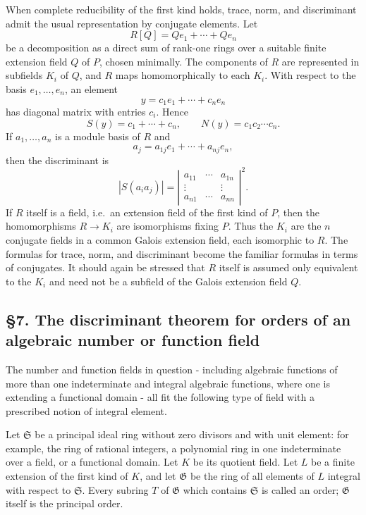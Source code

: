\documentclass[11pt]{article}
\begin{document}
When complete reducibility of the first kind holds, trace, norm, and
discriminant admit the usual representation by conjugate elements. Let
\[
  R[Q]=Qe_1+
\cdots+Qe_n
\] be a decomposition as a direct sum of rank-one rings over a suitable
finite extension field \(Q\) of \(P\), chosen minimally. The components
of \(R\) are represented in subfields \(K_i\) of \(Q\), and \(R\) maps
homomorphically to each \(K_i\). With respect to the basis \(e_1,
\ldots,e_n\), an element \[
  y=c_1e_1+
\cdots+c_ne_n
\] has diagonal matrix with entries \(c_i\). Hence \[
  S(y)=c_1+
\cdots+c_n,
  \qquad
  N(y)=c_1c_2\cdots c_n.
\] If \(a_1,
\ldots,a_n\) is a module basis of \(R\) and \[
  a_j=a_{1j}e_1+
\cdots+a_{nj}e_n,
\] then the discriminant is \[
  |S(a_i a_j)|=
  \left|
  \begin{matrix}
  a_{11}&\cdots&a_{1n}\\
  \vdots& &\vdots\\
  a_{n1}&\cdots&a_{nn}
  \end{matrix}
  \right|^2.
\] If \(R\) itself is a field, i.e.~an extension field of the first kind
of \(P\), then the homomorphisms \(R\to K_i\) are isomorphisms fixing
\(P\). Thus the \(K_i\) are the \(n\) conjugate fields in a common
Galois extension field, each isomorphic to \(R\). The formulas for
trace, norm, and discriminant become the familiar formulas in terms of
conjugates. It should again be stressed that \(R\) itself is assumed
only equivalent to the \(K_i\) and need not be a subfield of the Galois
extension field \(Q\).

\subsection{§7. The discriminant theorem for orders of an algebraic
number or function
field}\label{the-discriminant-theorem-for-orders-of-an-algebraic-number-or-function-field}

The number and function fields in question - including algebraic
functions of more than one indeterminate and integral algebraic
functions, where one is extending a functional domain - all fit the
following type of field with a prescribed notion of integral element.

Let \(\mathfrak S\) be a principal ideal ring without zero divisors and
with unit element: for example, the ring of rational integers, a
polynomial ring in one indeterminate over a field, or a functional
domain. Let \(K\) be its quotient field. Let \(L\) be a finite extension
of the first kind of \(K\), and let \(\mathfrak G\) be the ring of all
elements of \(L\) integral with respect to \(\mathfrak S\). Every
subring \(T\) of \(\mathfrak G\) which contains \(\mathfrak S\) is
called an order; \(\mathfrak G\) itself is the principal order.
\end{document}
